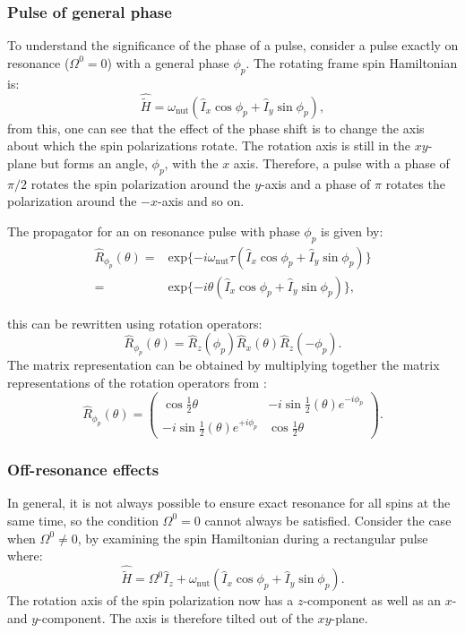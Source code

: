 \subsubsection{Pulse of general phase}

To understand the significance of the phase of a pulse, consider a pulse exactly on resonance
($\Omega^0 = 0$) with a general phase $\phi_p$. The rotating frame spin Hamiltonian is:
\begin{equation}
  \hat{\tilde{H}} = \omega_{\text{nut}}(\hat{I}_x\cos\phi_p + \hat{I}_y\sin\phi_p),
\end{equation}
from this, one can see that the effect of the phase shift is to change the axis about
which the spin polarizations rotate. The rotation axis is still in the $xy$-plane but forms
an angle, $\phi_p$, with the $x$ axis. Therefore, a pulse with a phase of $\pi/2$ rotates the spin
polarization around the $y$-axis and a phase of $\pi$ rotates the polarization around the $-x$-axis and
so on.

The propagator for an on resonance pulse with phase $\phi_p$ is given by:
\begin{align}
  \hat{R}_{\phi_p}(\theta) =& \text{exp}\{-i\omega_{\text{nut}}\tau(\hat{I}_x\cos\phi_p + \hat{I}_y\sin\phi_p)\}\\
  =& \text{exp}\{-i\theta(\hat{I}_x\cos\phi_p + \hat{I}_y\sin\phi_p)\},
\end{align}

this can be rewritten using rotation operators:
\begin{equation}
  \hat{R}_{\phi_p}(\theta) = \hat{R}_z(\phi_p)\hat{R}_x(\theta)\hat{R}_z(-\phi_p).
\end{equation}
The matrix representation can be obtained by multiplying together the matrix
representations of the rotation operators from :
\begin{equation}
  \hat{R}_{\phi_p}(\theta) = \begin{pmatrix}
    \cos\frac{1}{2}\theta & -i\sin\frac{1}{2}(\theta)e^{-i\phi_p}\\
    -i\sin\frac{1}{2}(\theta)e^{+i\phi_p} & \cos\frac{1}{2}\theta
\end{pmatrix}.
\end{equation}

\subsubsection{Off-resonance effects}

In general, it is not always possible to ensure exact resonance for all spins at the same
time, so the condition $\Omega^0 = 0$ cannot always be satisfied. Consider the
case when $\Omega^0 \neq 0$, by examining the spin Hamiltonian during a rectangular
pulse where:
\begin{equation}
  \hat{\tilde{H}} = \Omega^0\hat{I}_z + \omega_{\text{nut}}(\hat{I}_x\cos\phi_p + \hat{I}_y\sin\phi_p).
\end{equation}
The rotation axis of the spin polarization now has a $z$-component as well as an $x$- and $y$-component. The
axis is therefore tilted out of the $xy$-plane.

